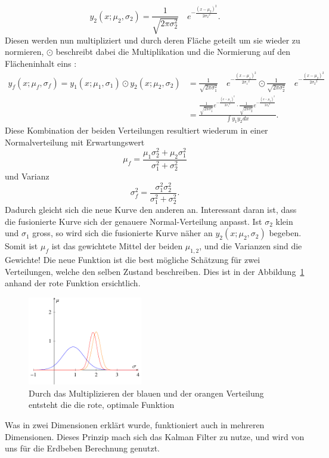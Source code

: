 \[ 
{y_2}(x;{\mu_2},{\sigma_2})=\frac{1}{\sqrt{2\pi\sigma_2^2}}\quad e^{-\frac{(x-{\mu_2})^2}{2{\sigma_2}^2}}.
\]
Diesen werden nun multipliziert und durch deren Fläche geteilt um sie wieder zu normieren, $\odot$ beschreibt dabei die Multiplikation und die Normierung auf den Flächeninhalt eins :
\begin{align*}
	{y_f}(x; {\mu_f}, {\sigma_f}) = {y_1}(x;{ \mu_1},{ \sigma_1}) \odot {y_2}(x; {\mu_2}, {\sigma_2})
	&=
	\frac{1}{\sqrt{2\pi\sigma_1^2}}\quad e^{-\frac{(x-{\mu_1})^2}{2{\sigma_1}^2}} \odot \frac{1}{\sqrt{2\pi\sigma_2^2}}\quad e^{-\frac{(x-{\mu_2})^2}{2{\sigma_2}^2}}
	\\
	&=
	\frac{ \frac{1}{\sqrt{2\pi\sigma_1^2}}e^{-\frac{(x-{\mu_1})^2}{2{\sigma_1}^2}} \cdot \frac{1}{\sqrt{2\pi\sigma_2^2}}e^{-\frac{(x-{\mu_2})^2}{2{\sigma_2}^2}}}{\int {y_1} {y_2} dx}.
\end{align*}
Diese Kombination der beiden Verteilungen resultiert wiederum in einer Normalverteilung
mit Erwartungswert
\[ \mu_f = \frac{\mu_1\sigma_2^2 + \mu_2 \sigma_1^2}{\sigma_1^2 + \sigma_2^2} \]
und Varianz
\[
\sigma_f^2 = \frac{\sigma_1^2 \sigma_2^2}{\sigma_1^2 + \sigma_2^2}.
\]
Dadurch gleicht sich die neue Kurve den anderen an. Interessant daran ist, dass die fusionierte Kurve sich der genauere Normal-Verteilung anpasst.
Ist ${\sigma_2}$ klein und ${\sigma_1}$ gross, so wird sich die fusionierte Kurve näher an ${y_2}(x;{\mu_2},{\sigma_2})$ begeben.
Somit ist $\mu_f$ ist das gewichtete Mittel der beiden $\mu_{1,2}$, und die Varianzen sind die Gewichte!
Die neue Funktion ist die best mögliche Schätzung für zwei Verteilungen, welche den selben Zustand beschreiben. 
Dies ist in der Abbildung~\ref{erdbeben:Gauss3} anhand der rote Funktion ersichtlich. 
\begin{figure}
 \begin{center}
 \includegraphics[width=5cm]{papers/erdbeben/Gausskurve3.pdf}
 \caption{Durch das Multiplizieren der blauen und der orangen Verteilung entsteht die die rote, optimale Funktion}
 \label{erdbeben:Gauss3}
 \end{center}
\end{figure}
Was in zwei Dimensionen erklärt wurde, funktioniert auch in mehreren Dimensionen. 
Dieses Prinzip mach sich das Kalman Filter zu nutze, und wird von uns für die Erdbeben Berechnung genutzt. 

